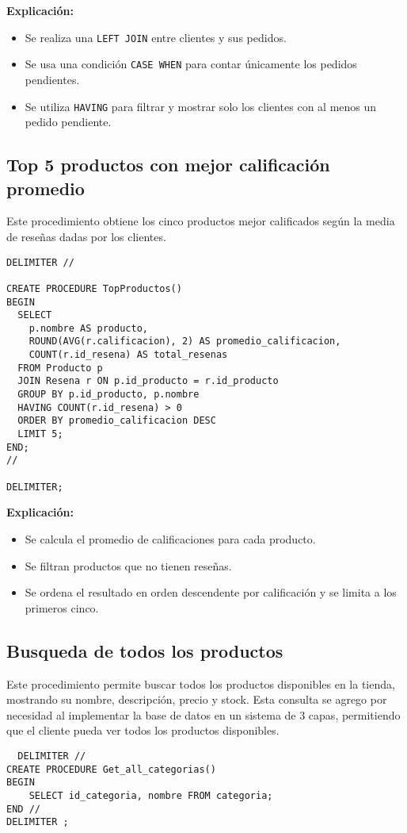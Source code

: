 \textbf{Explicación:}
\begin{itemize}
  \item Se realiza una \texttt{LEFT JOIN} entre clientes y sus pedidos.
  \item Se usa una condición \texttt{CASE WHEN} para contar únicamente los pedidos pendientes.
  \item Se utiliza \texttt{HAVING} para filtrar y mostrar solo los clientes con al menos un pedido pendiente.
\end{itemize}

\subsection{Top 5 productos con mejor calificación promedio}

Este procedimiento obtiene los cinco productos mejor calificados según la media de reseñas dadas por los clientes.

\begin{lstlisting}
DELIMITER //

CREATE PROCEDURE TopProductos()
BEGIN
  SELECT 
    p.nombre AS producto,
    ROUND(AVG(r.calificacion), 2) AS promedio_calificacion,
    COUNT(r.id_resena) AS total_resenas
  FROM Producto p
  JOIN Resena r ON p.id_producto = r.id_producto
  GROUP BY p.id_producto, p.nombre
  HAVING COUNT(r.id_resena) > 0
  ORDER BY promedio_calificacion DESC
  LIMIT 5;
END;
//

DELIMITER;
\end{lstlisting}

\textbf{Explicación:}
\begin{itemize}
  \item Se calcula el promedio de calificaciones para cada producto.
  \item Se filtran productos que no tienen reseñas.
  \item Se ordena el resultado en orden descendente por calificación y se limita a los primeros cinco.
\end{itemize}

\subsection{Busqueda de todos los productos}
Este procedimiento permite buscar todos los productos disponibles en la tienda, mostrando su nombre, descripción, precio y stock. Esta consulta se agrego por necesidad al 
implementar la base de datos en un sistema de 3 capas, permitiendo que el cliente pueda ver todos los productos disponibles.
\begin{lstlisting}
  DELIMITER //
CREATE PROCEDURE Get_all_categorias()
BEGIN
    SELECT id_categoria, nombre FROM categoria;
END //
DELIMITER ;
\end{lstlisting}

\newpage
